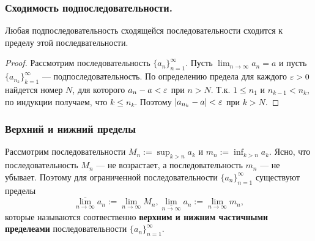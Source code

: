 \documentclass[12pt, a4paper]{article}
\begin{document}
    \subsubsection{Сходимость подпоследовательности.}
    Любая подпоследовательность сходящейся последовательности сходится к пределу этой последвательности.
    \begin{proof}
    Рассмотрим последовательность $\{a_n\}_{n=1}^{\infty}$. Пусть $\lim_{n \to \infty} a_n = a$ и пусть $\{a_{n_k}\}_{k=1}^{\infty}$ --- подпоследовательность. По определению предела для каждого $\varepsilon > 0$ найдется номер $N$, для которого $a_n - a < \varepsilon$ при $n > N$. Т.к. $1 \leq n_1$ и $n_{k-1} < n_k$, по индукции получаем, что $k \leq n_k$. Поэтому $|a_{n_k} - a| < \varepsilon$ при $k > N$.
    \end{proof}
    \subsubsection{Верхний и нижний пределы}
    Рассмотрим последовательности $M_n :=  \sup_{k > n} a_k$ и $m_n :=  \inf_{k > n} a_k$. Ясно, что последовательность $M_n$ --- не возрастает, а последовательность $m_n$ --- не убывает. Поэтому для ограниченной последовательности $\{a_n\}^{\infty}_{n=1}$ существуют пределы
    \begin{equation*}
        \overline{\lim_{n \to \infty}} a_n := \lim_{n \to \infty} M_n, \underset{n \to \infty}{\underline{\lim}} a_n := \lim_{n \to \infty} m_n,
    \end{equation*}
    которые называются соотвественно \textbf{верхним и нижним частичными пределеами} последовательности $\{a_n\}^{\infty}_{n=1}$.
\end{document}
